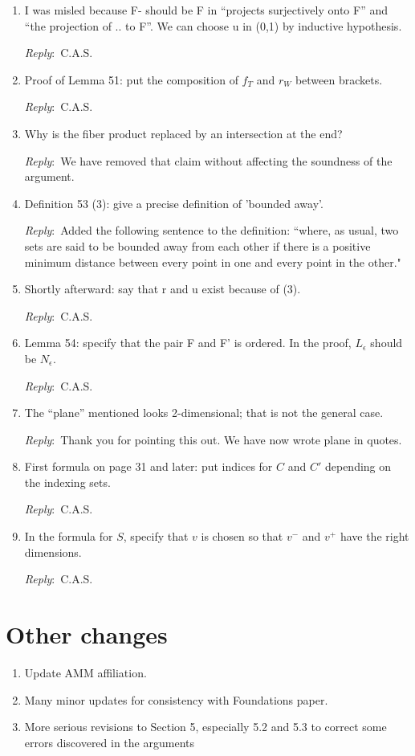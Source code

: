 \documentclass{amsart}
\newcommand{\ar}{\medskip\noindent\textit{Reply}:\ }
\newcommand{\cas}{\ar C.A.S.}
\begin{document}
\begin{enumerate}
	\item I was misled because F- should be F in “projects surjectively onto F” and “the projection of .. to F”. We can choose u in (0,1) by inductive hypothesis.

	\cas

	\item Proof of Lemma 51: put the composition of $f_T$ and $r_W$ between brackets.

	\cas

	\item Why is the fiber product replaced by an intersection at the end?

	\ar We have removed that claim without affecting the soundness of the argument.

	\item Definition 53 (3): give a precise definition of 'bounded away'.

	\ar Added the following sentence to the definition: ``where, as usual, two sets are said to be bounded away from each other if there is a positive minimum distance between every point in one and every point in the other."

	\item Shortly afterward: say that r and u exist because of (3).

	\cas

	\item Lemma 54: specify that the pair F and F' is ordered. In the proof, $L_\epsilon$ should be $N_\epsilon$.

	\cas

	\item The “plane” mentioned looks 2-dimensional; that is not the general case.

	\ar Thank you for pointing this out. We have now wrote plane in quotes.

	\item First formula on page 31 and later: put indices for $C$ and $C'$ depending on the indexing sets.

	\cas

	\item In the formula for $S$, specify that $v$ is chosen so that $v^-$ and $v^+$ have the right dimensions.

	\cas
\end{enumerate}

\section{Other changes}

\begin{enumerate}
	\item Update AMM affiliation.

	\item Many minor updates for consistency with Foundations paper.

	\item More serious revisions to Section 5, especially 5.2 and 5.3 to correct some errors discovered in the arguments

\end{enumerate}
\end{document}

